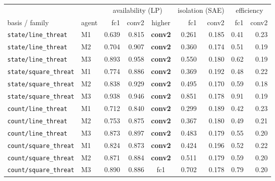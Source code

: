 \begin{tabular}{llrrcrrrr}
\toprule
& & \multicolumn{3}{c}{availability (LP)} & \multicolumn{2}{c}{isolation (SAE)} & \multicolumn{2}{c}{efficiency} \\
\cmidrule(lr){3-5}\cmidrule(lr){6-7}\cmidrule(lr){8-9}
basis / family & agent & fc1 & conv2 & higher & fc1 & conv2 & fc1 & conv2 \\
\midrule
\texttt{state/line\_threat} & M1 & 0.639 & 0.815 & \textbf{conv2} & 0.261 & 0.185 & 0.41 & 0.23 \\
\texttt{state/line\_threat} & M2 & 0.704 & 0.907 & \textbf{conv2} & 0.360 & 0.174 & 0.51 & 0.19 \\
\texttt{state/line\_threat} & M3 & 0.893 & 0.958 & \textbf{conv2} & 0.550 & 0.180 & 0.62 & 0.19 \\
\texttt{state/square\_threat} & M1 & 0.774 & 0.886 & \textbf{conv2} & 0.369 & 0.192 & 0.48 & 0.22 \\
\texttt{state/square\_threat} & M2 & 0.838 & 0.929 & \textbf{conv2} & 0.495 & 0.170 & 0.59 & 0.18 \\
\texttt{state/square\_threat} & M3 & 0.938 & 0.946 & \textbf{conv2} & 0.851 & 0.178 & 0.91 & 0.19 \\
\texttt{count/line\_threat} & M1 & 0.712 & 0.840 & \textbf{conv2} & 0.299 & 0.189 & 0.42 & 0.23 \\
\texttt{count/line\_threat} & M2 & 0.753 & 0.875 & \textbf{conv2} & 0.367 & 0.180 & 0.49 & 0.21 \\
\texttt{count/line\_threat} & M3 & 0.873 & 0.897 & \textbf{conv2} & 0.483 & 0.179 & 0.55 & 0.20 \\
\texttt{count/square\_threat} & M1 & 0.824 & 0.873 & \textbf{conv2} & 0.424 & 0.196 & 0.52 & 0.22 \\
\texttt{count/square\_threat} & M2 & 0.871 & 0.884 & \textbf{conv2} & 0.511 & 0.179 & 0.59 & 0.20 \\
\texttt{count/square\_threat} & M3 & 0.890 & 0.886 & fc1 & 0.702 & 0.178 & 0.79 & 0.20 \\
\bottomrule
\end{tabular}
